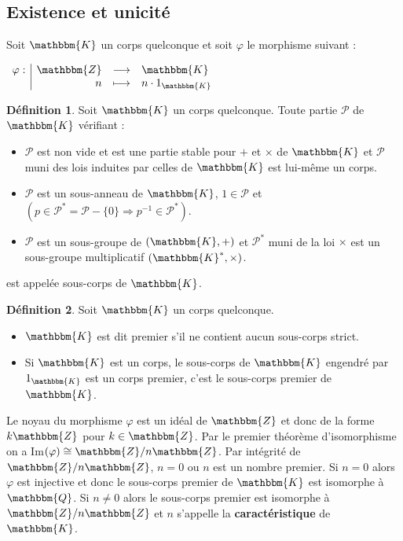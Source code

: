 \documentclass[12pt]{article}
\theoremstyle{remark}\newtheorem{note}{Note}
\theoremstyle{remark}\newtheorem{nota}{Notation}
\newcommand{\Z}{\mathbbm{Z}}
\newcommand{\Q}{\mathbbm{Q}}
\newcommand{\K}{\mathbbm{K}}
\theoremstyle{definition}
\newtheorem{definition}{Définition}
\begin{document}
\subsection{Existence et unicité}
\vspace{12pt}
Soit $\K$ un corps quelconque et soit $\varphi$ le morphisme suivant :
\begin{center}
$
\begin{array}{l|rcl}
\varphi : & \Z & \longrightarrow & \K \\
    & n & \longmapsto & n\cdot 1_{\K}
\end{array}
$
\end{center}
\vspace{12pt}
\begin{definition}
Soit $\K$ un corps quelconque. Toute partie $\mathcal{P}$ de $\K$ vérifiant :
\begin{itemize}
\item $\mathcal{P}$ est non vide et est une partie stable pour $+$ et $\times$ de $\K$ et $\mathcal{P}$ muni des lois induites par celles de $\K$ est lui-même un corps.
\item $\mathcal{P}$ est un sous-anneau de $\K$, $1 \in \mathcal{P}$ et $(p \in \mathcal{P}^{*} = \mathcal{P} - \{0 \} \Rightarrow p^{-1} \in \mathcal{P}^{*})$.
\item $\mathcal{P}$ est un sous-groupe de $(\K, +)$ et $\mathcal{P}^{*}$ muni de la loi $\times$ est un sous-groupe multiplicatif $(\K^{*}, \times)$.
\end{itemize}
est appelée sous-corps de $\K$.
\end{definition}
\vspace{12pt}
\begin{definition}
Soit $\K$ un corps quelconque.
\begin{itemize}
\item $\K$ est dit premier s'il ne contient aucun sous-corps strict.
\item Si $\K$ est un corps, le sous-corps de $\K$ engendré par $1_{\mathbbm{K}}$ est un corps premier, c'est le sous-corps premier de $\K$.
\end{itemize}
\end{definition}
\vspace{12pt}
Le noyau du morphisme $\varphi$ est un idéal de $\Z$ et donc de la forme $k\Z$ pour $k \in \Z$. Par le premier théorème d'isomorphisme on a Im$(\varphi) \cong \Z / n \Z$. Par intégrité de $\Z / n \Z$, $n=0$ ou $n$ est un nombre premier. Si $n=0$ alors $\varphi$ est injective et donc le sous-corps premier de $\K$ est isomorphe à $\Q$. Si $n \neq 0$ alors le sous-corps premier est isomorphe à $\Z / n \Z$ et $n$ s'appelle la \textbf{caractéristique} de $\K$. 
\\
\end{document}
